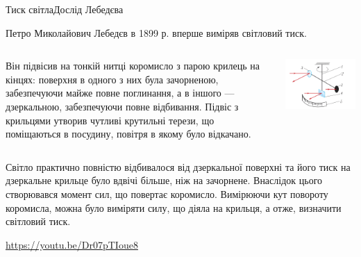 \documentclass[onlytextwidth]{beamer}
\begin{document}
\begin{frame}{Тиск світла}{Дослід Лебедєва}\small
	\begin{block}{}\justifying
		Петро Миколайович Лебедєв в 1899 р. вперше виміряв світловий тиск.
	\end{block}
	\begin{columns}
		\begin{column}{0.6\linewidth}
			\begin{block}{}\justifying
				Він підвісив на тонкій нитці коромисло з парою крилець на кінцях:
				поверхня в одного з них була зачорненою, забезпечуючи майже повне поглинання, а в іншого --- дзеркальною, забезпечуючи повне відбивання.
				Підвіс з крильцями утворив чутливі крутильні терези, що поміщаються в посудину, повітря в якому було відкачано.
			\end{block}
		\end{column}
		\begin{column}{0.4\linewidth}\centering
			\includegraphics[width=\linewidth]{LebedevExp}
		\end{column}
	\end{columns}

	\begin{block}{}\justifying
		Світло практично повністю відбивалося від дзеркальної поверхні та його тиск на дзеркальне крильце було вдвічі більше, ніж на зачорнене. Внаслідок цього створювався момент сил, що повертає коромисло. Вимірюючи кут повороту коромисла, можна було виміряти силу, що діяла на крильця, а отже, визначити світловий тиск.
	\end{block}
	{\tiny \url{https://youtu.be/Dr07pTIoue8}}
\end{frame}
\end{document}
